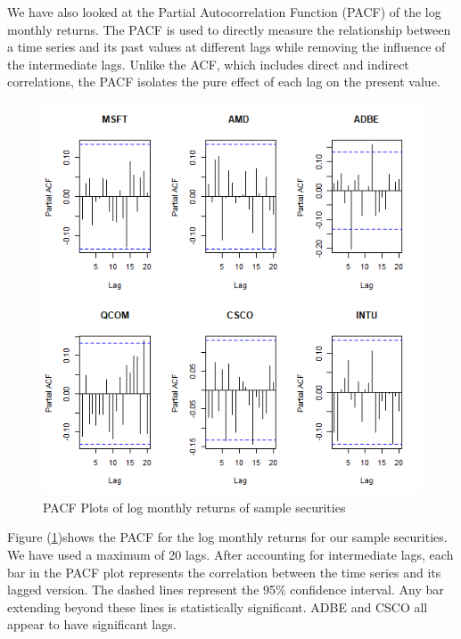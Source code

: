 \documentclass[12pt]{article}
\begin{document}
We have also looked at the Partial Autocorrelation Function (PACF) of the log monthly returns. The PACF is used to directly measure the relationship between a time series and its past values at different lags while removing the influence of the intermediate lags. Unlike the ACF, which includes direct and indirect correlations, the PACF isolates the pure effect of each lag on the present value.
\begin{figure}[h]
	\centering
	\includegraphics[height=0.8\linewidth]{plots/pacf_monthly_returns.png}
	\caption{PACF Plots of log monthly returns of sample securities}
	\label{fig:pacf_plot}
\end{figure}
Figure (\ref{fig:pacf_plot})shows the PACF for the log monthly returns for our sample securities. We have used a maximum of 20 lags. After accounting for intermediate lags, each bar in the PACF plot represents the correlation between the time series and its lagged version. The dashed lines represent the 95\% confidence interval. Any bar extending beyond these lines is statistically significant. ADBE and CSCO all appear to have significant lags.
\end{document}

